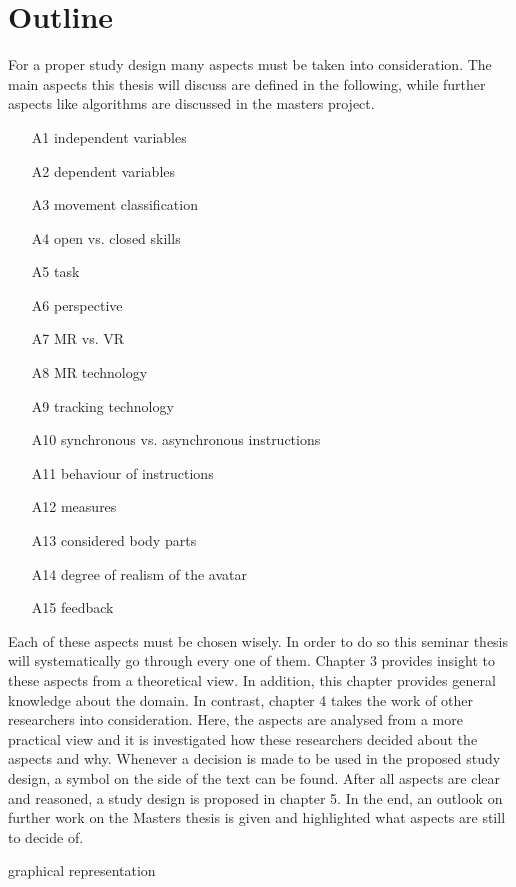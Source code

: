 \section{Outline}
For a proper study design many aspects must be taken into consideration. The main aspects this thesis will discuss are defined in the following, while further aspects like algorithms are discussed in the masters project.
\begin{itemize}
	\item[A1] independent variables%
	\item[A2] dependent variables%
	\item[A3] movement classification%
	\item[A4] open vs. closed skills%
	\item[A5] task%
	\item[A6] perspective%
	\item[A7] MR vs. VR%
	\item[A8] MR technology%
	\item[A9] tracking technology%
	\item[A10] synchronous vs. asynchronous instructions%
	\item[A11] behaviour of instructions%
	\item[A12] measures%
	\item[A13] considered body parts%
	\item[A14] degree of realism of the avatar%
	\item[A15] feedback%
\end{itemize}
Each of these aspects must be chosen wisely. In order to do so this seminar thesis will systematically go through every one of them. Chapter 3 provides insight to these aspects from a theoretical view. In addition, this chapter provides general knowledge about the domain. In contrast, chapter 4 takes the work of other researchers into consideration. Here, the aspects are analysed from a more practical view and it is investigated how these researchers decided about the aspects and why. Whenever a decision is made to be used in the proposed study design, a symbol on the side of the text can be found\markA. After all aspects are clear and reasoned, a study design is proposed in chapter 5. In the end, an outlook on further work on the Masters thesis is given and highlighted what aspects are still to decide of.

\todo graphical representation

